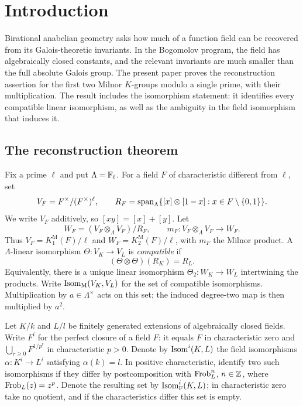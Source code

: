 \section{Introduction}\label{sec:introduction}

Birational anabelian geometry asks how much of a function field can be
recovered from its Galois-theoretic invariants. In the Bogomolov program,
the field has algebraically closed constants, and the relevant invariants
are much smaller than the full absolute Galois group. The present paper
proves the reconstruction assertion for the first two Milnor $K$-groups
modulo a single prime, with their multiplication. The result includes
the isomorphism statement: it identifies every compatible linear isomorphism,
as well as the ambiguity in the field isomorphism that induces it.

\subsection{The reconstruction theorem}

Fix a prime $\ell$ and put $\Lambda=\mathbb F_\ell$. For a field $F$ of
characteristic different from $\ell$, set
\[
 V_F=F^\times/(F^\times)^\ell,
 \qquad
 R_F=\operatorname{span}_\Lambda\{[x]\otimes[1-x]:x\in F\setminus\{0,1\}\}.
\]
We write $V_F$ additively, so $[xy]=[x]+[y]$. Let
\[
 W_F=(V_F\otimes_\Lambda V_F)/R_F,
 \qquad m_F:V_F\otimes_\Lambda V_F\longrightarrow W_F.
\]
Thus $V_F=K^{\mathrm M}_1(F)/\ell$ and
$W_F=K^{\mathrm M}_2(F)/\ell$, with $m_F$ the Milnor product.
A $\Lambda$-linear isomorphism $\Theta:V_K\to V_L$ is
\emph{compatible} if
\[
 (\Theta\otimes\Theta)(R_K)=R_L.
\]
Equivalently, there is a unique linear isomorphism $\Theta_2:W_K\to W_L$
intertwining the products. Write $\operatorname{Isom}_{\mathrm M}(V_K,V_L)$ for
the set of compatible isomorphisms. Multiplication by
$a\in\Lambda^\times$ acts on this set; the induced degree-two map
is then multiplied by $a^2$.

Let $K/k$ and $L/l$ be finitely generated extensions of algebraically
closed fields. Write $F^i$ for the perfect closure of a field $F$:
it equals $F$ in characteristic zero and
$\bigcup_{r\ge0}F^{1/p^r}$ in characteristic $p>0$. Denote by
$\operatorname{Isom}^i(K,L)$ the field isomorphisms $\alpha:K^i\to L^i$
satisfying $\alpha(k)=l$. In positive characteristic, identify two
such isomorphisms if they differ by postcomposition with
$\operatorname{Frob}_L^n$, $n\in\mathbb Z$, where $\operatorname{Frob}_L(z)=z^p$. Denote the resulting
set by $\operatorname{Isom}^i_{\mathrm F}(K,L)$; in characteristic zero take no
quotient, and if the characteristics differ this set is empty.

